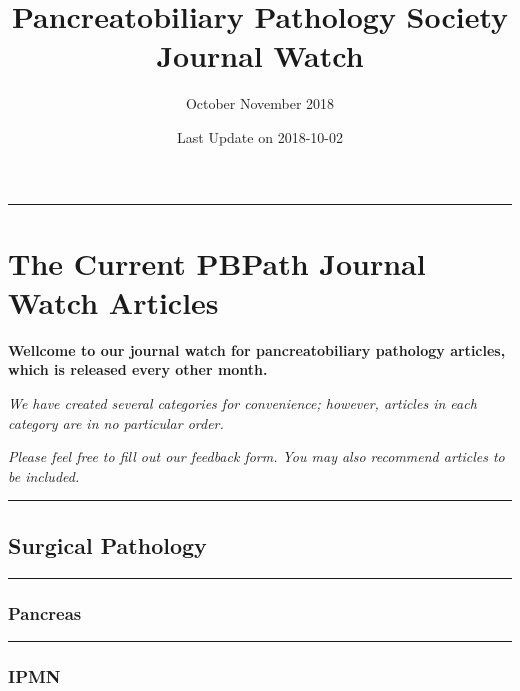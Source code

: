 \documentclass[]{article}
\title{Pancreatobiliary Pathology Society Journal Watch}
\subtitle{October November 2018}
\author{}
\date{Last Update on 2018-10-02}
\begin{document}
\maketitle

{
\setcounter{tocdepth}{5}
\tableofcontents
}
\begin{center}\rule{0.5\linewidth}{\linethickness}\end{center}

\hypertarget{the-current-pbpath-journal-watch-articles}{%
\section{The Current PBPath Journal Watch
Articles}\label{the-current-pbpath-journal-watch-articles}}

\textbf{Wellcome to our journal watch for pancreatobiliary pathology
articles, which is released every other month.}

\emph{We have created several categories for convenience; however,
articles in each category are in no particular order.}

\emph{Please feel free to fill out our feedback form. You may also
recommend articles to be included.}

\pagebreak

\begin{center}\rule{0.5\linewidth}{\linethickness}\end{center}

\hypertarget{surgical-pathology}{%
\subsection{Surgical Pathology}\label{surgical-pathology}}

\begin{center}\rule{0.5\linewidth}{\linethickness}\end{center}

\hypertarget{pancreas}{%
\subsubsection{Pancreas}\label{pancreas}}

\begin{center}\rule{0.5\linewidth}{\linethickness}\end{center}

\hypertarget{ipmn}{%
\subsubsection{IPMN}\label{ipmn}}
\end{document}
